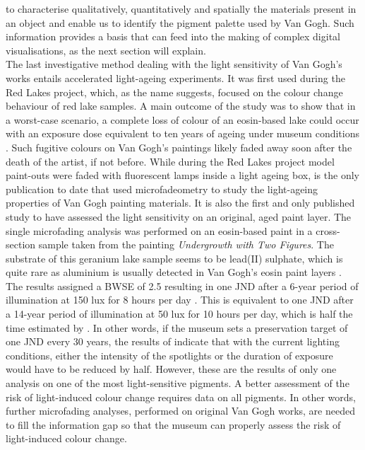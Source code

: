 to characterise qualitatively, quantitatively and spatially the materials present in an object and enable us to identify the pigment palette used by Van Gogh. Such information provides a basis that can feed into the making of complex digital visualisations, as the next section will explain.\\

The last investigative method dealing with the light sensitivity of Van Gogh's works entails accelerated light-ageing experiments. It was first used during the Red Lakes project, which, as the name suggests, focused on the colour change behaviour of red lake samples. A main outcome of the study was to show that in a worst-case scenario, a complete loss of colour of an eosin-based lake could occur with an exposure dose equivalent to ten years of ageing under museum conditions \citep{burnstock_comparison_2005,van_den_berg_fading_2006}. Such fugitive colours on Van Gogh's paintings likely faded away soon after the death of the artist, if not before. While during the Red Lakes project model paint-outs were faded with fluorescent lamps inside a light ageing box, \citet{fieberg_paintings_2017} is the only publication to date that used microfadeometry to study the light-ageing properties of Van Gogh painting materials. It is also the first and only published study to have assessed the light sensitivity on an original, aged paint layer. The single microfading analysis was performed on an eosin-based paint in a cross-section sample taken from the painting \textit{Undergrowth with Two Figures}. The substrate of this geranium lake sample seems to be lead(II) sulphate, which is quite rare as aluminium is usually detected in Van Gogh's eosin paint layers \citep{geldof_van_2013-3}. The results assigned a \gls{BWSE} of 2.5 resulting in one \gls{JND} after a 6-year period of illumination at 150 lux for 8 hours per day \citep[804]{fieberg_paintings_2017}. This is equivalent to one \gls{JND} after a 14-year period of illumination at 50 lux for 10 hours per day, which is half the time estimated by \citet{hendriks_valuing_2017}. In other words, if the museum sets a preservation target of one \gls{JND} every 30 years, the results of \citet{fieberg_paintings_2017} indicate that with the current lighting conditions, either the intensity of the spotlights or the duration of exposure would have to be reduced by half. However, these are the results of only one analysis on one of the most light-sensitive pigments. A better assessment of the risk of light-induced colour change requires data on all pigments. In other words, further microfading analyses, performed on original Van Gogh works, are needed to fill the information gap so that the museum can properly assess the risk of light-induced colour change.\\

